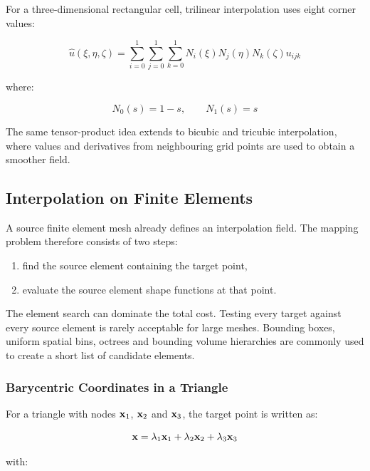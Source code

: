 For a three-dimensional rectangular cell, trilinear interpolation uses eight
corner values:

\begin{equation}
    \widehat{u}(\xi,\eta,\zeta) =
    \sum_{i=0}^{1}\sum_{j=0}^{1}\sum_{k=0}^{1}
    N_i(\xi)N_j(\eta)N_k(\zeta)u_{ijk}
\end{equation}

where:

\begin{equation}
    N_0(s)=1-s, \qquad N_1(s)=s
\end{equation}

The same tensor-product idea extends to bicubic and tricubic interpolation,
where values and derivatives from neighbouring grid points are used to obtain
a smoother field.

\subsection{Interpolation on Finite Elements}

A source finite element mesh already defines an interpolation field. The
mapping problem therefore consists of two steps:

\begin{enumerate}
    \item find the source element containing the target point,
    \item evaluate the source element shape functions at that point.
\end{enumerate}

The element search can dominate the total cost. Testing every target against
every source element is rarely acceptable for large meshes. Bounding boxes,
uniform spatial bins, octrees and bounding volume hierarchies are commonly used
to create a short list of candidate elements.

\subsubsection{Barycentric Coordinates in a Triangle}

For a triangle with nodes $ \mathbf{x}_1 $, $ \mathbf{x}_2 $ and $ \mathbf{x}_3 $, the target
point is written as:

\begin{equation}
    \mathbf{x} = \lambda_1\mathbf{x}_1+\lambda_2\mathbf{x}_2+\lambda_3\mathbf{x}_3
\end{equation}

with:

